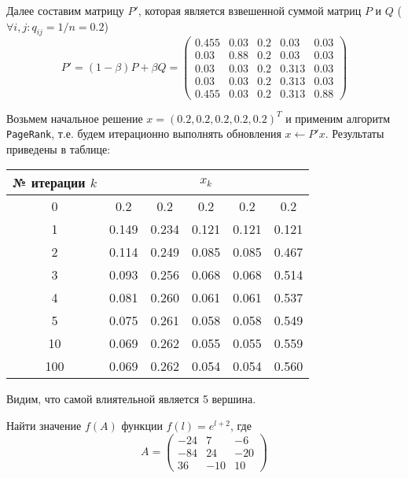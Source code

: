 Далее составим матрицу $P'$, которая является взвешенной суммой матриц $P$ и
$Q$ ($\forall i, j: q_{ij} = 1/n = 0.2$)
\begin{equation*}
    P' = (1 - \beta) P + \beta Q =
    \begin{pmatrix}
        0.455 & 0.03 & 0.2 & 0.03 & 0.03\\
        0.03 & 0.88 & 0.2 & 0.03 & 0.03\\
        0.03 & 0.03 & 0.2 & 0.313 & 0.03\\
        0.03 & 0.03 & 0.2 & 0.313 & 0.03\\
        0.455 & 0.03 & 0.2 & 0.313 & 0.88
    \end{pmatrix}
\end{equation*}

Возьмем начальное решение $x = (0.2, 0.2, 0.2, 0.2, 0.2)^T$ и применим алгоритм
\texttt{PageRank}, т.е. будем итерационно выполнять обновления
$x \leftarrow P'x$. Результаты приведены в таблице:
\begin{center}
    \begin{tabular}{c|c|c|c|c|c}
        № итерации $k$ & \multicolumn{5}{|c}{$x_k$}\\
        \hline
        0 & 0.2 & 0.2 & 0.2 & 0.2 & 0.2\\
        \hline
        1 & 0.149 & 0.234 & 0.121 & 0.121 & 0.121\\
        \hline
        2 & 0.114 & 0.249 & 0.085 & 0.085 & 0.467\\
        \hline
        3 & 0.093 & 0.256 & 0.068 & 0.068 & 0.514\\
        \hline
        4 & 0.081 & 0.260 & 0.061 & 0.061 & 0.537\\
        \hline
        5 & 0.075 & 0.261 & 0.058 & 0.058 & 0.549\\
        \hline
        10 & 0.069 & 0.262 & 0.055 & 0.055 & 0.559\\
        \hline
        100 & 0.069 & 0.262 & 0.054 & 0.054 & 0.560
    \end{tabular}
\end{center}
Видим, что самой влиятельной является 5 вершина.


\begin{problem}
    Найти значение $f(A)$ функции $f(l) = e^{l+2}$, где
    \begin{equation*}
        A = \begin{pmatrix}
            -24 & 7 & -6\\
            -84 & 24 & -20\\
            36 & -10 & 10
        \end{pmatrix}
    \end{equation*}
\end{problem}

